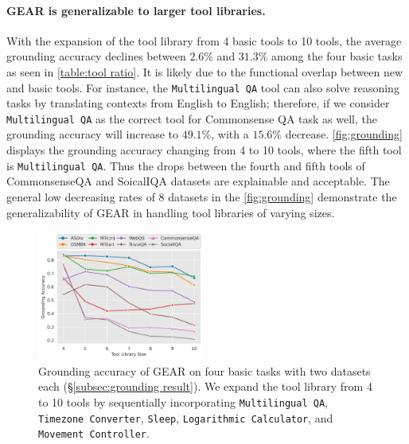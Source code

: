 \documentclass[11pt]{article}
\newcommand{\name}{{\fontfamily{cmss}\selectfont GEAR}}
\newcommand{\mlqa}{{\tt Multilingual QA}}
\newcommand{\tz}{{\tt Timezone Converter}}
\newcommand{\logcalc}{{\tt Logarithmic Calculator}}
\newcommand{\sleep}{{\tt Sleep}}
\newcommand{\map}{{\tt Movement Controller}}
\begin{document}
\paragraph{\name{} is generalizable to larger tool libraries.} With the expansion of the tool library from 4 basic tools to 10 tools, the average grounding accuracy declines between $2.6\%$ and $31.3\%$ among the four basic tasks as seen in \autoref{table:tool ratio}. It is likely due to the functional overlap between new and basic tools. For instance, the \mlqa{} tool can also solve reasoning tasks by translating contexts from English to English; therefore, if we consider \mlqa{} as the correct tool for Commonsense QA task as well, the grounding accuracy will increase to $49.1\%$, with a $15.6\%$ decrease. \autoref{fig:grounding} displays the grounding accuracy changing from 4 to 10 tools, where the fifth tool is \mlqa{}. Thus the drops between the fourth and fifth tools of CommonsenseQA and SoicalIQA datasets are explainable and acceptable. The general low decreasing rates of 8 datasets in the \autoref{fig:grounding} demonstrate the generalizability of \name{} in handling tool libraries of varying sizes.

\begin{figure}[t]
    \centering
    \includegraphics[width=0.49\textwidth,trim=0cm 0.5cm  0cm 0.2cm]{figures/affordance.png}
    \caption{Grounding accuracy of \name{} on four basic tasks with two datasets each (\S\ref{subsec:grounding result}). We expand the tool library from 4 to 10 tools by sequentially incorporating \mlqa{}, \tz{}, \sleep{}, \logcalc{}, and \map{}.}
    \label{fig:grounding}
\end{figure}
\end{document}
